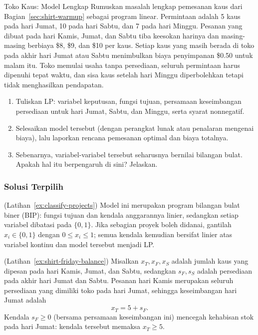 
\begin{ex}{Toko Kaus: Model Lengkap}{}
\label{ex:shirt-full-lp}
 Rumuskan masalah lengkap pemesanan kaus dari Bagian~\ref{sec:shirt-warmup} sebagai program linear. Permintaan adalah 5 kaus pada hari Jumat, 10 pada hari Sabtu, dan 7 pada hari Minggu. Pesanan yang dibuat pada hari Kamis, Jumat, dan Sabtu tiba keesokan harinya dan masing-masing berbiaya \$8, \$9, dan \$10 per kaus. Setiap kaus yang masih berada di toko pada akhir hari Jumat atau Sabtu menimbulkan biaya penyimpanan \$0.50 untuk malam itu. Toko memulai usaha tanpa persediaan, seluruh permintaan harus dipenuhi tepat waktu, dan sisa kaus setelah hari Minggu diperbolehkan tetapi tidak menghasilkan pendapatan.
\begin{enumerate}
\item Tuliskan LP: variabel keputusan, fungsi tujuan, persamaan keseimbangan persediaan untuk hari Jumat, Sabtu, dan Minggu, serta syarat nonnegatif.
\item Selesaikan model tersebut (dengan perangkat lunak atau penalaran mengenai biaya), lalu laporkan rencana pemesanan optimal dan biaya totalnya.
\item Sebenarnya, variabel-variabel tersebut seharusnya bernilai bilangan bulat. Apakah hal itu berpengaruh di sini? Jelaskan.
\end{enumerate}
\end{ex}

\subsubsection*{Solusi Terpilih}

\begin{solution}(Latihan~\ref{ex:classify-projects})
Model ini merupakan program bilangan bulat biner (BIP): fungsi tujuan dan kendala anggarannya linier, sedangkan setiap variabel dibatasi pada $\{0,1\}$. Jika sebagian proyek boleh didanai, gantilah $x_i \in \{0,1\}$ dengan $0 \leq x_i \leq 1$; semua kendala kemudian bersifat linier atas variabel kontinu dan model tersebut menjadi LP.
\end{solution}

\begin{solution}(Latihan~\ref{ex:shirt-friday-balance})
Misalkan $x_T, x_F, x_S$ adalah jumlah kaus yang dipesan pada hari Kamis, Jumat, dan Sabtu, sedangkan $s_F, s_S$ adalah persediaan pada akhir hari Jumat dan Sabtu. Pesanan hari Kamis merupakan seluruh persediaan yang dimiliki toko pada hari Jumat, sehingga keseimbangan hari Jumat adalah
\[
x_T = 5 + s_F .
\]
Kendala $s_F \geq 0$ (bersama persamaan keseimbangan ini) mencegah kehabisan stok pada hari Jumat: kendala tersebut memaksa $x_T \geq 5$.
\end{solution}

